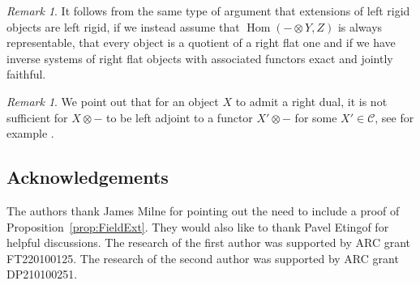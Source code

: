\documentclass[11pt]{amsart}
\def\Hom{\operatorname{Hom}}
\def\cC{\mathscr{C}}
\theoremstyle{definition}
\theoremstyle{remark}
\newtheorem{remark}[thm]{Remark}
\numberwithin{equation}{section}
\begin{document}
\begin{remark}\label{rem:C}
    It follows from the same type of argument that extensions of left rigid objects are left rigid, if we instead assume that $\Hom(-\otimes Y,Z)$ is always representable, that every object is a quotient of a right flat one and if we have inverse systems of right flat objects with associated functors exact and jointly faithful.
\end{remark}

\begin{remark}
    We point out that for an object $X$ to admit a right dual, it is not sufficient for $X\otimes -$ to be left adjoint to a functor $X'\otimes -$ for some $X'\in\cC$, see for example \cite{HZ}.
\end{remark}

\subsection*{Acknowledgements}
The authors thank James Milne for pointing out the need to include a proof of Proposition~\ref{prop:FieldExt}.  They would also like to thank Pavel Etingof for helpful discussions. The research of the first author was supported by ARC grant FT220100125.  The research of the second author was supported by ARC grant DP210100251.
\end{document}
